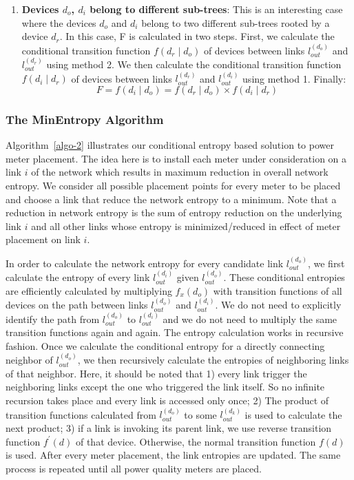 \begin{enumerate}
\item \textbf{Devices $d_o$, $d_i$ belong to different sub-trees}:
This is an interesting case where the devices $d_o$ and $d_i$ belong to two different sub-trees rooted by a device $d_r$. In this case, F is calculated in two steps. First, we calculate the conditional transition function $f(d_r \mid d_o)$ of devices between links $l_{out}^{(d_o)}$ and $l_{out}^{(d_r)}$ using method 2. We then calculate the conditional transition function $f(d_i \mid d_r)$ of devices between links $l_{out}^{(d_r)}$ and $l_{out}^{(d_i)}$ using method 1. Finally: 
\[F = f(d_i \mid d_o) = f(d_r \mid d_o) \times f(d_i \mid d_r)\]
\end{enumerate}

\subsubsection{The MinEntropy Algorithm}
Algorithm~\ref{algo-2} illustrates our conditional entropy based solution to power meter placement. The idea here is to install each meter under consideration on a link $i$ of the network which results in maximum reduction in overall network entropy. We consider all possible placement points for every meter to be placed and choose a link that reduce the network entropy to a minimum. Note that a reduction in network entropy is the sum of entropy reduction on the underlying link $i$ and all other links whose entropy is minimized/reduced in effect of meter placement on link $i$.

In order to calculate the network entropy for every candidate link $l_{out}^{(d_o)}$, we first calculate the entropy of every link $l_{out}^{(d_i)}$ given $l_{out}^{(d_o)}$. These conditional entropies are efficiently calculated by multiplying $f_x(d_o)$ with transition functions of all devices on the path between links $l_{out}^{(d_o)}$ and $l_{out}^{(d_i)}$. We do not need to explicitly identify the path from $l_{out}^{(d_o)}$ to $l_{out}^{(d_i)}$ and we do not need to multiply the same transition functions again and again. The entropy calculation works in recursive fashion. Once we calculate the conditional entropy for a directly connecting neighbor of $l_{out}^{(d_o)}$, we then recursively calculate the entropies of neighboring links of that neighbor. Here, it should be noted that 1) every link trigger the neighboring links except the one who triggered the link itself. So no infinite recursion takes place and every link is accessed only once; 2) The product of transition functions calculated from $l_{out}^{(d_o)}$ to some $l_{out}^{(d_k)}$ is used to calculate the next product; 3) if a link is invoking its parent link, we use reverse transition function $f^\prime(d)$ of that device. Otherwise, the normal transition function $f(d)$ is used. After every meter placement, the link entropies are updated. The same process is repeated until all power quality meters are placed.

